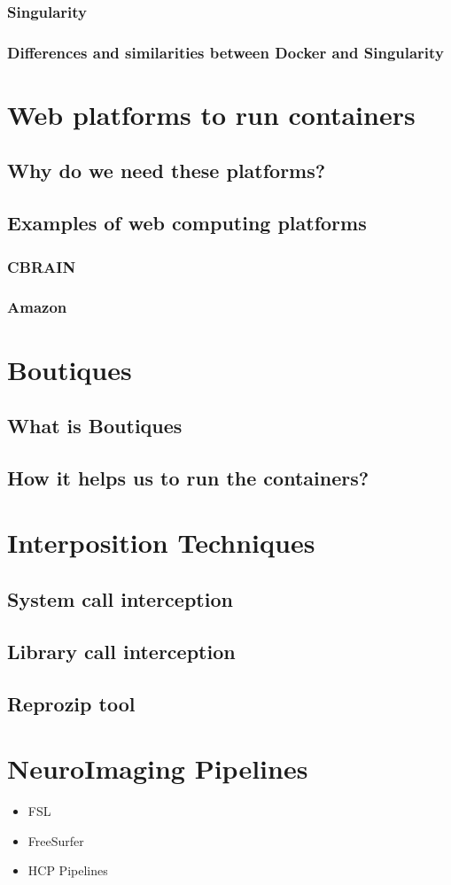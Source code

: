 \subsubsection{Singularity}
\subsubsection{Differences and similarities between Docker and Singularity}

\section{Web platforms to run containers}
\subsection{Why do we need these platforms?}
\subsection{Examples of web computing platforms}
\subsubsection{CBRAIN}
\subsubsection{Amazon}

\section{Boutiques}
\subsection{What is Boutiques}
\subsection{How it helps us to run the containers?}

\section{Interposition Techniques}
\subsection{System call interception}
\subsection{Library call interception}
\subsection{Reprozip tool}

\section{NeuroImaging Pipelines}
\begin{itemize}
 \item FSL
 \item FreeSurfer
 \item HCP Pipelines
\end{itemize}



